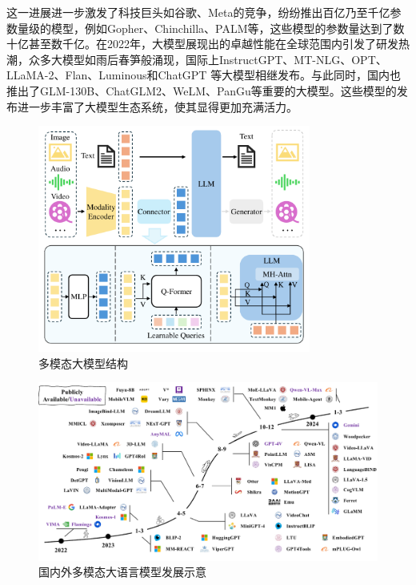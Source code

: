 这一进展进一步激发了科技巨头如谷歌、Meta的竞争，纷纷推出百亿乃至千亿参数量级的模型，例如Gopher、Chinchilla、PALM等，这些模型的参数量达到了数十亿甚至数千亿。在2022年，大模型展现出的卓越性能在全球范围内引发了研发热潮，众多大模型如雨后春笋般涌现，国际上InstructGPT、MT-NLG、OPT、LLaMA-2、Flan、Luminous和ChatGPT \cite{chatgpt2022} 等大模型相继发布。与此同时，国内也推出了GLM-130B、ChatGLM2、WeLM、PanGu等重要的大模型。这些模型的发布进一步丰富了大模型生态系统，使其显得更加充满活力。

\begin{figure}[h]
  \centering
  \includegraphics[width=0.8\textwidth]{./Img/多模态大模型结构.pdf}
  \caption{多模态大模型结构}\label{fig:a-01}
\end{figure}


\begin{figure}[ht]
  \centering
  \includegraphics[width=1.0\textwidth]{./Img/多模态大语言模型.pdf}
  \caption{国内外多模态大语言模型发展示意}\label{fig:a-02}
\end{figure}


